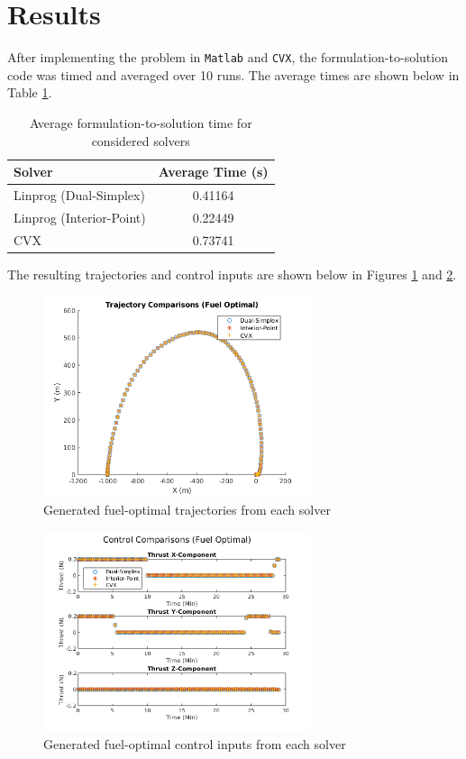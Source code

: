 \documentclass{article}
\begin{document}
\section{Results}

After implementing the problem in \texttt{Matlab} and \texttt{CVX}, the formulation-to-solution code was timed and averaged over 10 runs.
The average times are shown below in Table \ref{tab:timing}.

\begin{table}[h]
\centering
\begin{tabular}{| l | c |}
  \hline
  Solver & Average Time (s) \\ \hline
  Linprog (Dual-Simplex) & 0.41164 \\
  Linprog (Interior-Point) & 0.22449 \\
  CVX & 0.73741 \\ \hline
\end{tabular}
\caption{Average formulation-to-solution time for considered solvers}
\label{tab:timing}
\end{table}

The resulting trajectories and control inputs are shown below in Figures \ref{fig:trajectories-fuel} and \ref{fig:controls-fuel}.

\begin{figure}[H]
  \centering
  \includegraphics[width=0.7\textwidth]{images/trajectories_fuel.png}
  \caption{Generated fuel-optimal trajectories from each solver}
  \label{fig:trajectories-fuel}
\end{figure}

\begin{figure}[H]
  \centering
  \includegraphics[width=0.7\textwidth]{images/controls_fuel.png}
  \caption{Generated fuel-optimal control inputs from each solver}
  \label{fig:controls-fuel}
\end{figure}
\end{document}
